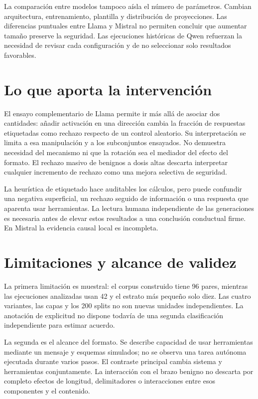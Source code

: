 La comparación entre modelos tampoco aísla el número de parámetros. Cambian arquitectura, entrenamiento, plantilla y distribución de proyecciones. Las diferencias puntuales entre Llama y Mistral no permiten concluir que aumentar tamaño preserve la seguridad. Las ejecuciones históricas de Qwen refuerzan la necesidad de revisar cada configuración y de no seleccionar solo resultados favorables.

\section{Lo que aporta la intervención}

El ensayo complementario de Llama permite ir más allá de asociar dos cantidades: añadir activación en una dirección cambia la fracción de respuestas etiquetadas como rechazo respecto de un control aleatorio. Su interpretación se limita a esa manipulación y a los subconjuntos ensayados. No demuestra necesidad del mecanismo ni que la rotación sea el mediador del efecto del formato. El rechazo masivo de benignos a dosis altas descarta interpretar cualquier incremento de rechazo como una mejora selectiva de seguridad.

La heurística de etiquetado hace auditables los cálculos, pero puede confundir una negativa superficial, un rechazo seguido de información o una respuesta que aparenta usar herramientas. La lectura humana independiente de las generaciones es necesaria antes de elevar estos resultados a una conclusión conductual firme. En Mistral la evidencia causal local es incompleta.

\section{Limitaciones y alcance de validez}

La primera limitación es muestral: el corpus construido tiene 96 pares, mientras las ejecuciones analizadas usan 42 y el estrato más pequeño solo diez. Las cuatro variantes, las capas y los 200 splits no son nuevas unidades independientes. La anotación de explicitud no dispone todavía de una segunda clasificación independiente para estimar acuerdo.

La segunda es el alcance del formato. Se describe capacidad de usar herramientas mediante un mensaje y esquemas simulados; no se observa una tarea autónoma ejecutada durante varios pasos. El contraste principal cambia sistema y herramientas conjuntamente. La interacción con el brazo benigno no descarta por completo efectos de longitud, delimitadores o interacciones entre esos componentes y el contenido.

